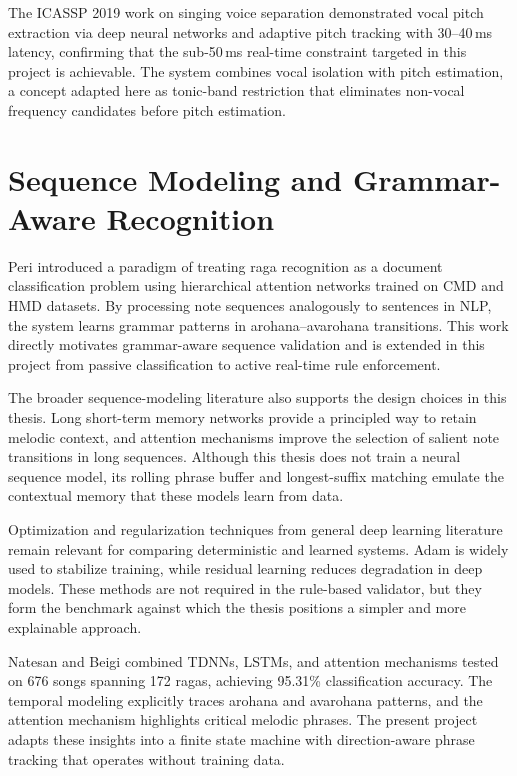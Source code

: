 \documentclass[12pt,a4paper]{report}
\numberwithin{equation}{chapter}
\begin{document}
The ICASSP 2019 work on singing voice separation \cite{icassp2019singing} demonstrated vocal pitch extraction via deep neural networks and adaptive pitch tracking with 30--40\,ms latency, confirming that the sub-50\,ms real-time constraint targeted in this project is achievable. The system combines vocal isolation with pitch estimation, a concept adapted here as tonic-band restriction that eliminates non-vocal frequency candidates before pitch estimation.

\section{Sequence Modeling and Grammar-Aware Recognition}
Peri \cite{peri2023applying} introduced a paradigm of treating raga recognition as a document classification problem using hierarchical attention networks trained on CMD and HMD datasets. By processing note sequences analogously to sentences in NLP, the system learns grammar patterns in arohana--avarohana transitions. This work directly motivates grammar-aware sequence validation and is extended in this project from passive classification to active real-time rule enforcement.

The broader sequence-modeling literature also supports the design choices in this thesis. Long short-term memory networks \cite{hochreiter1997lstm} provide a principled way to retain melodic context, and attention mechanisms \cite{vaswani2017attention} improve the selection of salient note transitions in long sequences. Although this thesis does not train a neural sequence model, its rolling phrase buffer and longest-suffix matching emulate the contextual memory that these models learn from data.

Optimization and regularization techniques from general deep learning literature remain relevant for comparing deterministic and learned systems. Adam \cite{kingma2015adam} is widely used to stabilize training, while residual learning \cite{he2016resnet} reduces degradation in deep models. These methods are not required in the rule-based validator, but they form the benchmark against which the thesis positions a simpler and more explainable approach.

Natesan and Beigi \cite{natesan2020carnatic} combined TDNNs, LSTMs, and attention mechanisms tested on 676 songs spanning 172 ragas, achieving 95.31\% classification accuracy. The temporal modeling explicitly traces arohana and avarohana patterns, and the attention mechanism highlights critical melodic phrases. The present project adapts these insights into a finite state machine with direction-aware phrase tracking that operates without training data.
\end{document}
